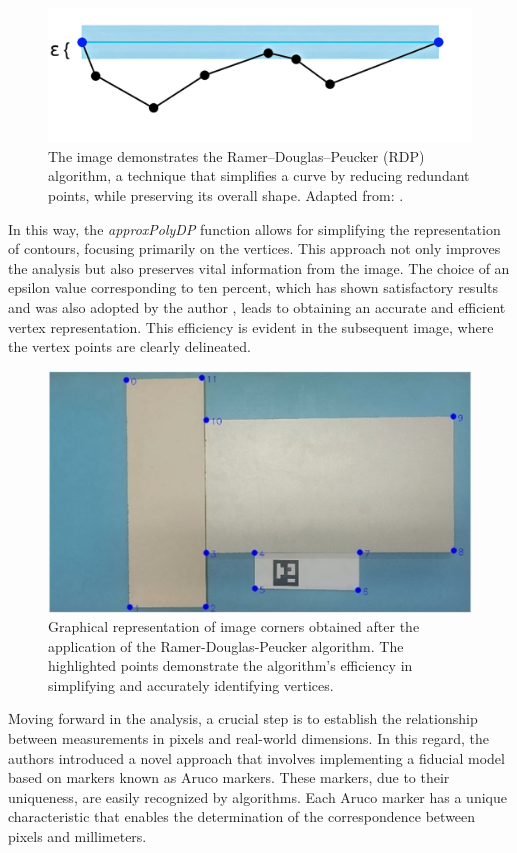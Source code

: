 \begin{figure}[!ht]
 \centering
         \centering
         \includegraphics[width=0.65\linewidth]{images/Development/chap4/rdp.png}
         \caption{The image demonstrates the Ramer–Douglas–Peucker (RDP) algorithm, a technique that simplifies a curve by reducing redundant points, while preserving its overall shape. Adapted from: \cite{fabian_hirschmann_ramer-douglas-peucker_nodate}.}
         \label{fig:rdp}
\end{figure}

In this way, the \emph{approxPolyDP} function allows for simplifying the representation of contours, focusing primarily on the vertices. This approach not only improves the analysis but also preserves vital information from the image. The choice of an epsilon value corresponding to ten percent, which has shown satisfactory results and was also adopted by the author \textcite{minichino2015learning}, leads to obtaining an accurate and efficient vertex representation. This efficiency is evident in the subsequent image, where the vertex points are clearly delineated.

\begin{figure}[!ht]
 \centering
         \centering
         \includegraphics[width=0.65\linewidth]{images/Development/chap4/corners.jpg}
         \caption{Graphical representation of image corners obtained after the application of the Ramer-Douglas-Peucker algorithm. The highlighted points demonstrate the algorithm's efficiency in simplifying and accurately identifying vertices.}
         \label{fig:rdp}
\end{figure}

Moving forward in the analysis, a crucial step is to establish the relationship between measurements in pixels and real-world dimensions. In this regard, the authors \textcite{GARRIDOJURADO20142280} introduced a novel approach that involves implementing a fiducial model based on markers known as Aruco markers. These markers, due to their uniqueness, are easily recognized by algorithms. Each Aruco marker has a unique characteristic that enables the determination of the correspondence between pixels and millimeters.

